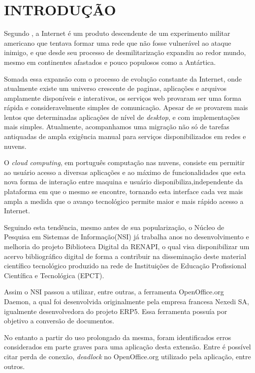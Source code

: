 \chapter{INTRODUÇÃO}
\thispagestyle{empty}

Segundo \cite{TESLA}, a Internet é um produto descendente de um experimento militar americano que tentava formar uma rede que não fosse vulnerável ao ataque inimigo, e que desde seu processo de desmilitarização expandiu ao redor mundo, mesmo em continentes afastados e pouco populosos como a Antártica.

Somada essa expansão com o processo de evolução constante da Internet, onde atualmente existe um universo crescente de paginas, aplicações e arquivos amplamente disponíveis e interativos, os serviços web provaram ser uma forma rápida e consideravelmente simples de comunicação. Apesar de se provarem mais lentos que determinadas aplicações de nível de \textit{desktop}, e com implementações mais simples. Atualmente, acompanhamos uma migração não só de tarefas antiquadas de ampla exigência manual para serviços disponibilizados em redes e nuvens.

O \textit{cloud computing}, em português computação nas nuvens, consiste em permitir ao usuário acesso a diversas aplicações e ao máximo de funcionalidades que esta nova forma de interação entre maquina e usuário disponibiliza,independente da plataforma em que o mesmo se encontre, tornando esta interface cada vez mais ampla a medida que o avanço tecnológico permite maior e mais rápido acesso a Internet.

Seguindo esta tendência, mesmo antes de sua popularização, o Núcleo de Pesquisa em Sistemas de Informação(NSI) já trabalha anos no desenvolvimento e melhoria do projeto Biblioteca Digital da RENAPI, o qual visa disponibilizar um acervo bibliográfico digital de forma a contribuir na disseminação deste material científico tecnológico produzido na rede de Instituições de Educação Profissional Científica e Tecnológica (EPCT).

Assim o NSI passou a utilizar, entre outras, a ferramenta OpenOffice.org Daemon, a qual foi desenvolvida originalmente pela empresa francesa Nexedi SA, igualmente desenvolvedora do projeto ERP5. Essa ferramenta possuía por objetivo a conversão de documentos.

No entanto a partir do uso prolongado da mesma, foram identificados erros considerados em parte graves para uma aplicação desta extensão. Entre é possível citar perda de conexão, \textit{deadlock} no OpenOffice.org utilizado pela aplicação, entre outros.

